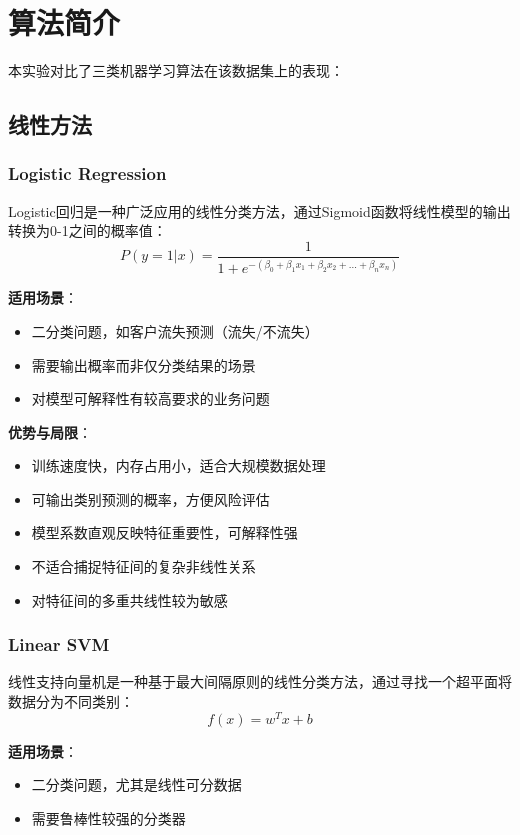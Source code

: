 \documentclass{article}
\begin{document}
\section{算法简介}
本实验对比了三类机器学习算法在该数据集上的表现：

\subsection{线性方法}
\subsubsection{Logistic Regression}
Logistic回归是一种广泛应用的线性分类方法，通过Sigmoid函数将线性模型的输出转换为0-1之间的概率值：
\begin{equation}
P(y=1|x) = \frac{1}{1 + e^{-(\beta_0 + \beta_1 x_1 + \beta_2 x_2 + ... + \beta_n x_n)}}
\end{equation}

\textbf{适用场景}：
\begin{itemize}
    \item 二分类问题，如客户流失预测（流失/不流失）
    \item 需要输出概率而非仅分类结果的场景
    \item 对模型可解释性有较高要求的业务问题
\end{itemize}

\textbf{优势与局限}：
\begin{itemize}
    \item 训练速度快，内存占用小，适合大规模数据处理
    \item 可输出类别预测的概率，方便风险评估
    \item 模型系数直观反映特征重要性，可解释性强
    \item 不适合捕捉特征间的复杂非线性关系
    \item 对特征间的多重共线性较为敏感
\end{itemize}

\subsubsection{Linear SVM}
线性支持向量机是一种基于最大间隔原则的线性分类方法，通过寻找一个超平面将数据分为不同类别：
\begin{equation}
f(x) = w^T x + b
\end{equation}

\textbf{适用场景}：
\begin{itemize}
    \item 二分类问题，尤其是线性可分数据
    \item 需要鲁棒性较强的分类器
\end{itemize}
\end{document}
